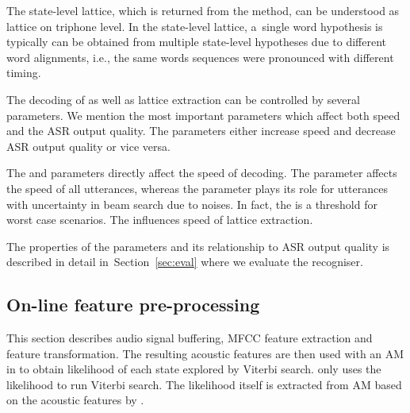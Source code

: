 The state-level lattice, which is returned from the  method, can be understood as lattice on triphone level.
In the state-level lattice, a~single word hypothesis is typically can be obtained from multiple state-level hypotheses due to different word alignments, i.e., the same words sequences were pronounced with different timing.

The decoding of  as well as lattice extraction can be controlled by several parameters.
We mention the most important parameters which affect both speed and the \ac{ASR} output quality. 
The parameters either increase speed and decrease \ac{ASR} output quality or vice versa.

The  and  parameters directly affect the speed of decoding. 
The  parameter affects the speed of all utterances, whereas the  parameter plays its role for utterances with uncertainty in beam search due to noises.
In fact, the  is a threshold for worst case scenarios.
The  influences speed of lattice extraction. 

The properties of the parameters and its relationship to \ac{ASR} output quality is described in detail in~Section~\ref{sec:eval} where we evaluate the recogniser. 

\subsection{On-line feature pre-processing} 
\label{sub:preprocess}
This section describes audio signal buffering, \ac{MFCC} feature extraction and feature transformation. 
The resulting acoustic features are then used with an \ac{AM} in  to obtain likelihood of each state explored by Viterbi search.
 only uses the likelihood to run Viterbi search.
The likelihood itself is extracted from \ac{AM} based on the acoustic features by . 

